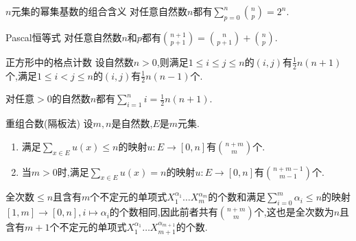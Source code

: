 \begin{proposition}{$n$元集的幂集基数的组合含义}{}
	对任意自然数$n$都有$\sum\limits_{p=0}^{n}\binom{n}{p}=2^{n}$.
\end{proposition}

\begin{proposition}{Pascal恒等式}{}
	对任意自然数$n$和$p$都有$\binom{n+1}{p+1}=\binom{n}{p+1}+\binom{n}{p}$.
\end{proposition}

\begin{proposition}{正方形中的格点计数}{}
	设自然数$n>0$,则满足$1\leq i\leq j\leq n$的$\left(i,j\right)$有$\frac{1}{2}n\left(n+1\right)$个,满足$1\leq i<j\leq n$的$\left(i,j\right)$有$\frac{1}{2}n\left(n-1\right)$个.
\end{proposition}

\begin{corollary}{}{}
	对任意$>0$的自然数$n$都有$\sum\limits_{i=1}^{n}i=\frac{1}{2}n\left(n+1\right)$.
\end{corollary}

\begin{proposition}{重组合数(隔板法)}{}
	设$m,n$是自然数,$E$是$m$元集.
	\begin{enumerate}
		\item 满足$\sum\limits_{x\in E}u\left(x\right)\leq n$的映射$u:E\to\left[0,n\right]$有$\binom{n+m}{m}$个.
		\item 当$m>0$时,满足$\sum\limits_{x\in E}u\left(x\right)=n$的映射$u:E\to\left[0,n\right]$有$\binom{n+m-1}{m-1}$个.
	\end{enumerate}
\end{proposition}

\begin{remark}{}{}
	全次数$\leq n$且含有$m$个不定元的单项式$X_{1}^{\alpha_{1}}\ldots X_{m}^{\alpha_{m}}$的个数和满足$\sum\limits_{i=0}^{m}\alpha_{i}\leq n$的映射$\left[1,m\right]\to\left[0,n\right],i\mapsto\alpha_{i}$的个数相同,因此前者共有$\binom{n+m}{m}$个,这也是全次数为$n$且含有$m+1$个不定元的单项式$X_{1}^{\alpha_{1}}\ldots X_{m+1}^{\alpha_{m+1}}$的个数.
\end{remark}






















































